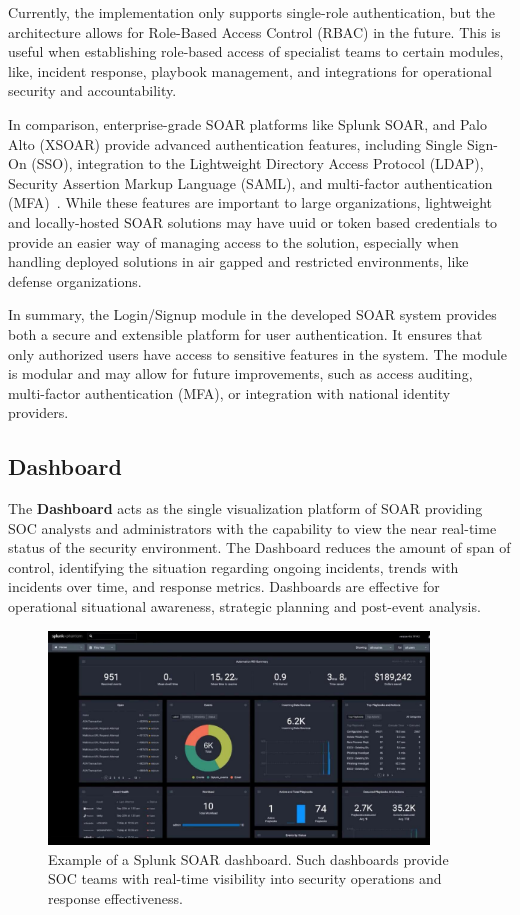 Currently, the implementation only supports single-role authentication, but the architecture allows for Role-Based Access Control (RBAC) in the future. This is useful when establishing role-based access of specialist teams to certain modules, like, incident response, playbook management, and integrations for operational security and accountability. 

In comparison, enterprise-grade SOAR platforms like Splunk SOAR, and Palo Alto (XSOAR) provide advanced authentication features, including Single Sign-On (SSO), integration to the Lightweight Directory Access Protocol (LDAP), Security Assertion Markup Language (SAML), and multi-factor authentication (MFA)~\cite{splunk, paloalto}. While these features are important to large organizations, lightweight and locally-hosted SOAR solutions may have uuid or token based credentials to provide an easier way of managing access to the solution, especially when handling deployed solutions in air gapped and restricted environments, like defense organizations.

In summary, the Login/Signup module in the developed SOAR system provides both a secure and extensible platform for user authentication. It ensures that only authorized users have access to sensitive features in the system. The module is modular and may allow for future improvements, such as access auditing, multi-factor authentication (MFA), or integration with national identity providers.

\subsection{Dashboard}

The \textbf{Dashboard} acts as the single visualization platform of SOAR providing SOC analysts and administrators with the capability to view the near real-time status of the security  environment. The Dashboard reduces the amount of span of control, identifying the situation  regarding ongoing incidents, trends with incidents over time, and response metrics.  Dashboards are effective for operational situational awareness, strategic planning and post-event analysis.

\begin{figure}[ht]
    \centering
    \includegraphics[width=0.9\textwidth]{images/splunk_soar_dashboard.jpg}
    \caption[Example of a Splunk SOAR dashboard]{Example of a Splunk SOAR dashboard. Such dashboards provide SOC teams with real-time visibility into security operations and response effectiveness.}
    \label{fig:splunk-soar-dashboard}
\end{figure}


